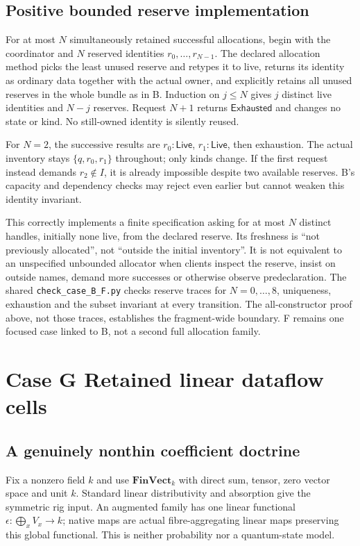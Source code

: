 \documentclass[11pt,a4paper]{article}
\theoremstyle{definition}
\newcommand{\FinVect}{\mathbf{FinVect}}
\begin{document}
\subsection{Positive bounded reserve implementation}
For at most $N$ simultaneously retained successful allocations, begin
with the coordinator and $N$ reserved identities $r_0,\ldots,r_{N-1}$.
The declared allocation method picks the least unused reserve and retypes
it to live, returns its identity as ordinary data together with the
actual owner, and explicitly retains all unused reserves in the whole
bundle as in B. Induction on $j\leq N$ gives $j$ distinct live identities
and $N-j$ reserves. Request $N+1$ returns $\mathsf{Exhausted}$ and changes
no state or kind. No still-owned identity is silently reused.

For $N=2$, the successive results are $r_0:\mathsf{Live}$,
$r_1:\mathsf{Live}$, then exhaustion. The actual inventory stays
$\{q,r_0,r_1\}$ throughout; only kinds change. If the first request
instead demands $r_2\notin I$, it is already impossible despite two
available reserves. B's capacity and dependency checks may reject even
earlier but cannot weaken this identity invariant.

This correctly implements a finite specification asking for at most
$N$ distinct handles, initially none live, from the declared reserve.
Its freshness is ``not previously allocated'', not ``outside the initial
inventory''. It is not equivalent to an unspecified unbounded allocator
when clients inspect the reserve, insist on outside names, demand more
successes or otherwise observe predeclaration. The shared
\texttt{check\_case\_B\_F.py} checks reserve traces for $N=0,\ldots,8$,
uniqueness, exhaustion and the subset invariant at every transition.
The all-constructor proof above, not those traces, establishes the
fragment-wide boundary. F remains one focused case linked to B, not a
second full allocation family.


\section{Case G Retained linear dataflow cells}\label{sec:caseG}

\subsection{A genuinely nonthin coefficient doctrine}
Fix a nonzero field $k$ and use $\FinVect_k$ with direct sum, tensor,
zero vector space and unit $k$. Standard linear distributivity and
absorption give the symmetric rig input. An augmented family has one
linear functional $\epsilon:\bigoplus_xV_x\to k$; native maps are
actual fibre-aggregating linear maps preserving this global functional.
This is neither probability nor a quantum-state model.
\end{document}
